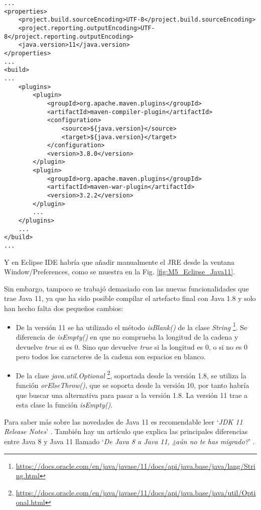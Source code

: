 \begin{minipage}{\linewidth}
{\tiny
\begin{lstlisting}[breaklines]
...
<properties>
	<project.build.sourceEncoding>UTF-8</project.build.sourceEncoding>
	<project.reporting.outputEncoding>UTF-8</project.reporting.outputEncoding>
	<java.version>11</java.version>
</properties>
...
<build>
...
	<plugins>
		<plugin>
			<groupId>org.apache.maven.plugins</groupId>
			<artifactId>maven-compiler-plugin</artifactId>
			<configuration>
				<source>${java.version}</source>
				<target>${java.version}</target>
			</configuration>
			<version>3.8.0</version>
		</plugin>
		<plugin>
			<groupId>org.apache.maven.plugins</groupId>
			<artifactId>maven-war-plugin</artifactId>
			<version>3.2.2</version>
		</plugin>
		...
	</plugins>
	...
</build>
...
\end{lstlisting}
}
\end{minipage}

Y en Eclipse IDE habría que añadir manualmente el JRE desde la ventana Window/Preferences, como se muestra en la Fig. \ref{fig:M5_Eclipse_Java11}.


Sin embargo, tampoco se trabajó demasiado con las nuevas funcionalidades que trae Java 11, ya que ha sido posible compilar el artefacto final con Java 1.8 y solo han hecho falta dos pequeños cambios:
\begin{itemize}
	\item De la versión 11 se ha utilizado el método \textit{isBlank()} de la clase \textit{String} \footnote{\url{https://docs.oracle.com/en/java/javase/11/docs/api/java.base/java/lang/String.html}}. Se diferencia de \textit{isEmpty()} en que no comprueba la longitud de la cadena y devuelve \textit{true} si es 0. Sino que devuelve \textit{true} si la longitud es 0, o si no es 0 pero todos los caracteres de la cadena son espacios en blanco.
	\item De la clase \textit{java.util.Optional} \footnote{\url{https://docs.oracle.com/en/java/javase/11/docs/api/java.base/java/util/Optional.html}}, soportada desde la versión 1.8, se utiliza la función \textit{orElseThrow()}, que se soporta desde la versión 10, por tanto habría que buscar una alternativa para pasar a la versión 1.8. La versión 11 trae a esta clase la función \textit{isEmpty()}.
\end{itemize}

Para saber más sobre las novedades de Java 11 es recomendable leer `\textit{JDK 11 Release Notes}' \cite{noauthor_jdk_nodate}. También hay un artículo que explica las principales diferencias entre Java 8 y Java 11 llamado `\textit{De Java 8 a Java 11, ¿aún no te has migrado?}' \cite{hoyo_java_2019}.

